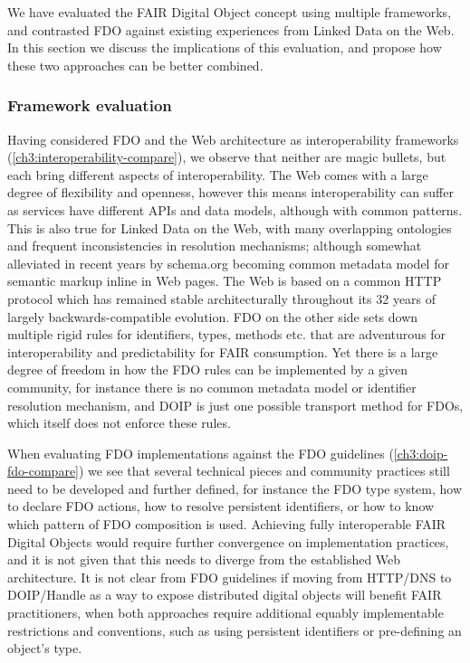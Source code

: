 We have evaluated the FAIR Digital Object concept using multiple frameworks, and contrasted FDO against existing experiences from Linked Data on the Web. In this section we discuss the implications of this evaluation, and propose how these two approaches can be better combined.

\subsubsection{Framework evaluation}\label{ch3:frameworkevaluation}

Having considered FDO and the Web architecture as interoperability frameworks (\vref{ch3:interoperability-compare}), we observe that neither are magic bullets, but each bring different aspects of interoperability. The Web comes with a large degree of flexibility and openness, however this means interoperability can suffer as services have different APIs and data models, although with common patterns. This is also true for Linked Data on the Web, with many overlapping ontologies and frequent inconsistencies in resolution mechanisms; although somewhat alleviated in recent years by schema.org becoming common metadata model for semantic markup inline in Web pages. The Web is based on a common HTTP protocol which has remained stable architecturally throughout its 32 years of largely backwards-compatible evolution. FDO on the other side sets down multiple rigid rules for identifiers, types, methods etc. that are adventurous for interoperability and predictability for FAIR consumption. Yet there is a large degree of freedom in how the FDO rules can be implemented by a given community, for instance there is no common metadata model or identifier resolution mechanism, and DOIP is just one possible transport method for FDOs, which itself does not enforce these rules. 

When evaluating FDO implementations against the FDO guidelines (\vref{ch3:doip-fdo-compare}) we see that several technical pieces and community practices still need to be developed and further defined, for instance the FDO type system, how to declare FDO actions, how to resolve persistent identifiers, or how to know which pattern of FDO composition is used. Achieving fully interoperable FAIR Digital Objects would require further convergence on implementation practices, and it is not given that this needs to diverge from the established Web architecture.  It is not clear from FDO guidelines if moving from HTTP/DNS to DOIP/Handle as a way to expose distributed digital objects will benefit FAIR practitioners, when both approaches require additional equably implementable restrictions and conventions, such as using persistent identifiers or pre-defining an object's type. 

